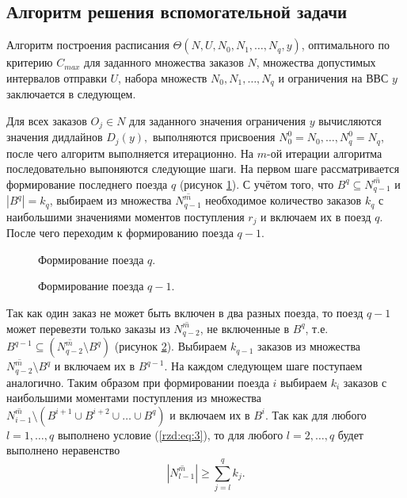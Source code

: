 \subsection{Алгоритм решения вспомогательной задачи}\label{rzd:sec:aux2c:6}

Алгоритм построения расписания $\Theta(N,U,N_0, N_1, \dots, N_q, y)$, оптимального по критерию $C_{max}$ для заданного множества заказов $N$, множества допустимых интервалов отправки $U$, набора множеств $N_0, N_1, \dots, N_q$ и ограничения на ВВС $y$ заключается в следующем.

Для всех заказов $O_j \in N $ для заданного значения ограничения $y$ вычисляются значения дидлайнов $D_j(y),$ выполняются присвоения $N_0^0 = N_0, \dots, N_q^0 = N_q$, после чего алгоритм выполняется итерационно.
На $m$-ой итерации алгоритма последовательно выпоняются следующие шаги.
На первом шаге рассматривается формирование последнего поезда $q$ (рисунок \ref{rzd:pic:2}). С учётом того, что $B^q \subseteq \overline{N^m_{q-1}}$ и $|B^q| = k_q$, выбираем из множества $\overline{N^m_{q-1}}$ необходимое количество заказов $k_q$ с наибольшими значениями моментов поступления $r_j$ и включаем их в поезд $q$. После чего переходим к формированию поезда $q-1$.


\begin{figure}[h!]
\caption{Формирование поезда $q$.}
\label{rzd:pic:2}
\end{figure}

\begin{figure}[h!]
\caption{Формирование поезда $q-1$.}
\label{rzd:pic:3}
\end{figure}

Так как один заказ не может быть включен в два разных поезда, то поезд $q-1$ может перевезти только заказы из $\overline{N^m_{q-2}}$, не включенные в $B^q$, т.е. $B^{q-1} \subseteq (\overline{N^m_{q-2}} \setminus B^q)$ (рисунок \ref{rzd:pic:3}). Выбираем $k_{q-1}$ заказов из множества $\overline{N^m_{q-2}} \setminus B^q$ и включаем их в $B^{q-1}$. На каждом следующем шаге поступаем аналогично. Таким образом при формировании поезда $i$ выбираем $k_i$ заказов с наибольшими моментами поступления из множества $\overline{N^m_{i-1}} \setminus (B^{i+1} \cup B^{i+2} \cup \dots \cup B^q)$ и включаем их в $B^i$. Так как для любого $l=1, \dots, q$ выполнено условие (\ref{rzd:eq:3}),
то для любого $l=2, \dots, q$ будет выполнено неравенство
$$ |\overline{N^m_{l-1}}| \geq \sum\limits_{j=l}^q k_j.$$

